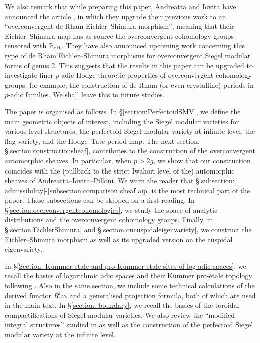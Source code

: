 We also remark that while preparing this paper, Andreatta and Iovita have announced the article \cite{AI-2020}, in which they upgrade their previous work \cite{AIS-2015} to an ``overconvergent de Rham Eichler--Shimura morphism'', meaning that their Eichler--Shimura map has as source the overconvergent cohomology groups tensored with $\operatorname{\mathbb{B}}_{\mathrm{dR}}$.
They have also announced upcoming work concerning this type of de Rham Eichler--Shimura morphisms for overconvergent Siegel modular forms of genus $2$. This suggests that the results in this paper can be upgraded to investigate finer $p$-adic Hodge theoretic properties of overconvergent cohomology groups; for example, the construction of de Rham (or even crystalline) periods in $p$-adic families. We shall leave this to future studies. 

The paper is organised as follows. In \S \ref{section:PerfectoidSMV}, we define the main geometric objects of interest, including the Siegel modular varieties for various level structures, the perfectoid Siegel modular variety at infinite level, the flag variety, and the Hodge--Tate period map. The next section, \S \ref{section:constructionsheaf}, contributes to the construction of the overconvergent automorphic sheaves. In particular, when $p>2g$, we show that our construction coincides with the (pullback to the strict Iwahori level of the) automorphic sheaves of Andreatta--Iovita--Pilloni. We warn the reader that \S \ref{subsection: admissibility}-\ref{subsection:comparison sheaf aip} is the most technical part of the paper. These subsections can be skipped on a first reading. In \S \ref{section:overconvergentcohomologies}, we study the space of analytic distributions and the overconvergent cohomology groups. Finally, in \S \ref{section:EichlerShimura} and \S \ref{section:oncuspidaleigenvariety}, we construct the Eichler--Shimura morphism as well as its upgraded version on the cuspidal eigenvariety. 

In \S \ref{Section: Kummer etale and pro-Kummer etale sites of log adic spaces}, we recall the basics of logarithmic adic spaces and their Kummer pro-\'etale topology following \cite{Diao}. Also in the same section, we include some technical calculations of the derived functor $R^i \nu_*$ and a generalised projection formula, both of which are used in the main text. In \S \ref{section: boundary}, we recall the basics of the toroidal compactifications of Siegel modular varieties. We also review the ``modified integral structures'' studied in \cite{Pilloni-Stroh-CoherentCohomologyandGaloisRepresentations} as well as the construction of the perfectoid Siegel modular variety at the infinite level.

